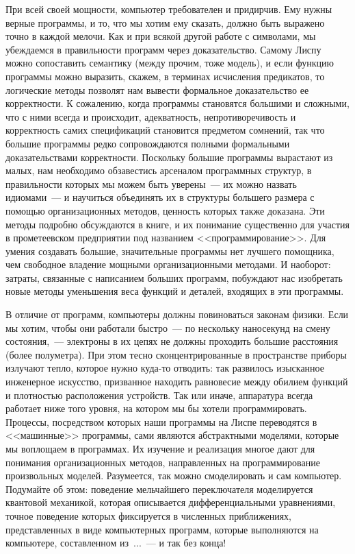 При всей своей мощности, компьютер требователен и придирчив.
Ему нужны верные программы, и то, что мы хотим ему
сказать, должно быть выражено точно в каждой мелочи.  Как и при всякой
другой работе с символами, мы убеждаемся в правильности программ
через доказательство.  Самому Лиспу можно сопоставить семантику
(между прочим, тоже модель), и если функцию программы можно
выразить, скажем, в терминах исчисления предикатов, то логические
методы позволят нам вывести формальное доказательство ее
корректности.  К сожалению, когда программы становятся большими и
сложными, что с ними всегда и происходит, адекватность,
непротиворечивость и корректность самих спецификаций становится
предметом сомнений, так что большие программы редко сопровождаются
полными формальными доказательствами корректности. Поскольку большие
программы вырастают из малых, нам необходимо обзавестись арсеналом
программных структур,  в правильности которых мы можем быть уверены~---
их можно назвать идиомами~--- и научиться объединять их в структуры 
большего размера с помощью организационных методов, ценность которых
также доказана. Эти методы подробно обсуждаются в книге, и их
понимание существенно для участия в прометеевском предприятии под
названием <<программирование>>. Для умения создавать большие,
значительные программы нет лучшего помощника, чем свободное владение
мощными организационными методами.  И наоборот: затраты, связанные с написанием больших программ,
побуждают нас изобретать новые методы уменьшения веса функций и 
деталей, входящих в эти программы.


В отличие от программ, компьютеры должны повиноваться законам 
физики. Если мы хотим, чтобы они работали быстро~--- по нескольку наносекунд на
смену состояния,~--- электроны в их цепях не должны проходить большие
расстояния (более полуметра). При этом тесно сконцентрированные в
пространстве приборы излучают тепло, которое нужно куда-то
отводить: так развилось изысканное инженерное искусство,
призванное находить равновесие между обилием функций и плотностью
расположения устройств. Так или иначе, аппаратура всегда работает
ниже того уровня, на котором мы бы хотели программировать. Процессы,
посредством которых наши программы на Лиспе переводятся в <<машинные>>
программы, сами являются абстрактными моделями, которые мы воплощаем в
программах. Их 
изучение и реализация многое дают для понимания организационных методов, 
направленных на программирование произвольных моделей.  Разумеется, так
можно смоделировать и сам компьютер. Подумайте об этом: поведение
мельчайшего переключателя моделируется квантовой механикой, которая
описывается дифференциальными уравнениями, точное поведение которых
фиксируется в численных приближениях, представленных в виде
компьютерных программ, которые выполняются на компьютере, составленном
из~...~--- и так без конца!

